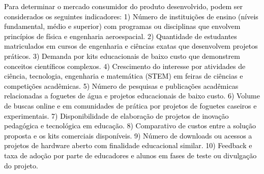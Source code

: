 \textcolor{black}{Para determinar o mercado consumidor do produto desenvolvido, podem ser considerados os seguintes indicadores: 1) Número de instituições de ensino (níveis fundamental, médio e superior) com programas ou disciplinas que envolvem princípios de física e engenharia aeroespacial. 2) Quantidade de estudantes matriculados em cursos de engenharia e ciências exatas que desenvolvem projetos práticos. 3) Demanda por kits educacionais de baixo custo que demonstrem conceitos científicos complexos. 4) Crescimento do interesse por atividades de ciência, tecnologia, engenharia e matemática (STEM) em feiras de ciências e competições acadêmicas. 5) Número de pesquisas e publicações acadêmicas relacionadas a foguetes de água e projetos educacionais de baixo custo. 6) Volume de buscas online e em comunidades de prática por projetos de foguetes caseiros e experimentais. 7) Disponibilidade de elaboração de projetos de inovação pedagógica e tecnológica em educação. 8) Comparativo de custos entre a solução proposta e os kits comerciais disponíveis. 9) Número de downloads ou acessos a projetos de hardware aberto com finalidade educacional similar. 10) Feedback e taxa de adoção por parte de educadores e alunos em fases de teste ou divulgação do projeto.}


